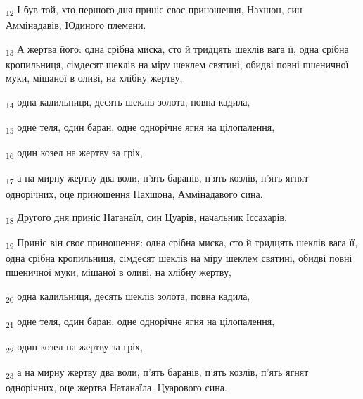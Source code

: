 \begin{tcolorbox}
\textsubscript{12} І був той, хто першого дня приніс своє приношення, Нахшон, син Аммінадавів, Юдиного племени.
\end{tcolorbox}
\begin{tcolorbox}
\textsubscript{13} А жертва його: одна срібна миска, сто й тридцять шеклів вага її, одна срібна кропильниця, сімдесят шеклів на міру шеклем святині, обидві повні пшеничної муки, мішаної в оливі, на хлібну жертву,
\end{tcolorbox}
\begin{tcolorbox}
\textsubscript{14} одна кадильниця, десять шеклів золота, повна кадила,
\end{tcolorbox}
\begin{tcolorbox}
\textsubscript{15} одне теля, один баран, одне однорічне ягня на цілопалення,
\end{tcolorbox}
\begin{tcolorbox}
\textsubscript{16} один козел на жертву за гріх,
\end{tcolorbox}
\begin{tcolorbox}
\textsubscript{17} а на мирну жертву два воли, п'ять баранів, п'ять козлів, п'ять ягнят однорічних, оце приношення Нахшона, Аммінадавого сина.
\end{tcolorbox}
\begin{tcolorbox}
\textsubscript{18} Другого дня приніс Натанаїл, син Цуарів, начальник Іссахарів.
\end{tcolorbox}
\begin{tcolorbox}
\textsubscript{19} Приніс він своє приношення: одна срібна миска, сто й тридцять шеклів вага її, одна срібна кропильниця, сімдесят шеклів на міру шеклем святині, обидві повні пшеничної муки, мішаної в оливі, на хлібну жертву,
\end{tcolorbox}
\begin{tcolorbox}
\textsubscript{20} одна кадильниця, десять шеклів золота, повна кадила,
\end{tcolorbox}
\begin{tcolorbox}
\textsubscript{21} одне теля, один баран, одне однорічне ягня на цілопалення,
\end{tcolorbox}
\begin{tcolorbox}
\textsubscript{22} один козел на жертву за гріх,
\end{tcolorbox}
\begin{tcolorbox}
\textsubscript{23} а на мирну жертву два воли, п'ять баранів, п'ять козлів, п'ять ягнят однорічних, оце жертва Натанаїла, Цуарового сина.
\end{tcolorbox}

